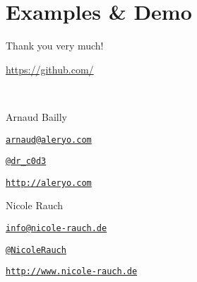 \section{Examples \& Demo}

\begin{frame}{Thank you very much!}

  \url{https://github.com/}

  ~\\[1em]
  \begin{block}{Arnaud Bailly}
        \begin{description}[Twitterxx]
        \item[E-Mail]  \href{mailto:arnaud@aleryo.com}{\texttt{arnaud@aleryo.com}}
        \item[Twitter] \href{http://twitter.com/NicoleRauch}{\texttt{@dr\_c0d3}}
        \item[Web] \href{http://aleryo.com}{\texttt{http://aleryo.com}}
        \end{description}
  \end{block}
  \begin{block}{Nicole Rauch}
    \begin{description}[Twitterxx]
    \item[E-Mail]  \href{mailto:info@nicole-rauch.de}{\texttt{info@nicole-rauch.de}}
    \item[Twitter] \href{http://twitter.com/NicoleRauch}{\texttt{@NicoleRauch}}
    \item[Web] \href{http://www.nicole-rauch.de}{\texttt{http://www.nicole-rauch.de}}
    \end{description}
  \end{block}
\end{frame}
